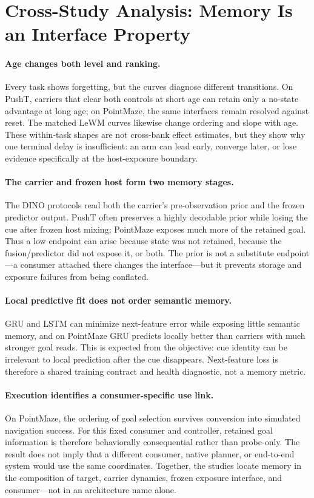 

\section{Cross-Study Analysis: Memory Is an Interface Property}

\paragraph{Age changes both level and ranking.}
Every task shows forgetting, but the curves diagnose different transitions.
On PushT, carriers that clear both controls at short age can retain only a
no-state advantage at long age; on PointMaze, the same interfaces remain
resolved against reset.  The matched LeWM curves likewise change ordering and
slope with age.  These within-task shapes are not cross-bank effect estimates,
but they show why one terminal delay is insufficient: an arm can lead early,
converge later, or lose evidence specifically at the host-exposure boundary.

\paragraph{The carrier and frozen host form two memory stages.}
The DINO protocols read both the carrier's pre-observation prior and the frozen
predictor output.  PushT often preserves a highly decodable prior while losing
the cue after frozen host mixing; PointMaze exposes much more of the retained
goal.  Thus a low endpoint can arise because state was not retained, because
the fusion/predictor did not expose it, or both.  The prior is not a substitute
endpoint---a consumer attached there changes the interface---but it prevents
storage and exposure failures from being conflated.

\paragraph{Local predictive fit does not order semantic memory.}
GRU and LSTM can minimize next-feature error while exposing little semantic
memory, and on PointMaze GRU predicts locally better than carriers with much
stronger goal reads.  This is expected from the objective: cue identity can be
irrelevant to local prediction after the cue disappears.  Next-feature loss is
therefore a shared training contract and health diagnostic, not a memory
metric.

\paragraph{Execution identifies a consumer-specific use link.}
On PointMaze, the ordering of goal selection survives conversion into simulated
navigation success.  For this fixed consumer and controller, retained goal
information is therefore behaviorally consequential rather than probe-only.
The result does not imply that a different consumer, native planner, or
end-to-end system would use the same coordinates.  Together, the studies locate
memory in the composition of target, carrier dynamics, frozen exposure
interface, and consumer---not in an architecture name alone.

